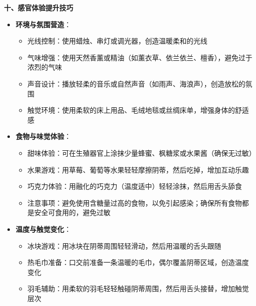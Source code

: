 \documentclass[12pt,UTF8]{ctexbook}
\begin{document}
  \textbf{十、感官体验提升技巧}
  \begin{itemize}
  \item \textbf{环境与氛围营造}：
    \begin{itemize}
    \item 光线控制：使用蜡烛、串灯或调光器，创造温暖柔和的光线
    \item 气味增强：使用天然香薰或精油（如薰衣草、依兰依兰、檀香），避免过于浓烈的气味
    \item 声音设计：播放轻柔的音乐或自然声音（如雨声、海浪声），创造放松的氛围
    \item 触觉环境：使用柔软的床上用品、毛绒地毯或丝绸床单，增强身体的舒适感
    \end{itemize}
  \item \textbf{食物与味觉体验}：
    \begin{itemize}
    \item 甜味体验：可在生殖器官上涂抹少量蜂蜜、枫糖浆或水果酱（确保无过敏）
    \item 水果游戏：用草莓、葡萄等水果轻轻摩擦阴蒂，然后吃掉，增加互动乐趣
    \item 巧克力体验：用融化的巧克力（温度适中）轻轻涂抹，然后用舌头舔食
    \item 注意事项：避免使用含糖量过高的食物，以免引起感染；确保所有食物都是安全可食用的，避免过敏
    \end{itemize}
  \item \textbf{温度与触觉变化}：
    \begin{itemize}
    \item 冰块游戏：用冰块在阴蒂周围轻轻滑动，然后用温暖的舌头跟随
    \item 热毛巾准备：口交前准备一条温暖的毛巾，偶尔覆盖阴蒂区域，创造温度变化
    \item 羽毛辅助：用柔软的羽毛轻轻触碰阴蒂周围，然后用舌头接替，增加触觉层次
    \end{itemize}
  \end{itemize}
\end{document}

